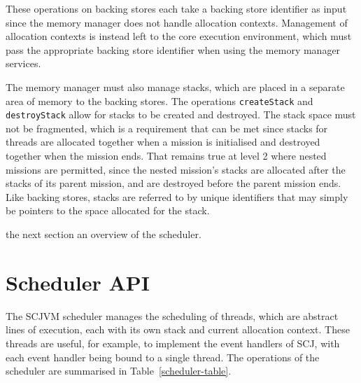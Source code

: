 These operations on backing stores each take a backing store
identifier as input since the memory manager does not handle
allocation contexts.
Management of allocation contexts is instead left to the core
execution environment, which must pass the appropriate backing store
identifier when using the memory manager services.

The memory manager must also manage stacks, which are placed in a
separate area of memory to the backing stores.
The operations \texttt{create\-Stack} and \texttt{destroy\-Stack}
allow for stacks to be created and destroyed.
The stack space must not be fragmented, which is a requirement that
can be met since stacks for threads are allocated together when a
mission is initialised and destroyed together when the mission ends.
That remains true at level 2 where nested missions are permitted,
since the nested mission's stacks are allocated after the stacks of
its parent mission, and are destroyed before the parent mission ends.
Like backing stores, stacks are referred to by unique identifiers that
may simply be pointers to the space allocated for the stack.

the next section an
overview of the scheduler.

\section{Scheduler API}
\label{scheduler-section}

The SCJVM scheduler manages the scheduling of threads, which are
abstract lines of execution, each with its own stack and current
allocation context.
These threads are useful, for example, to implement the event handlers
of SCJ, with each event handler being bound to a single thread.
The operations of the scheduler are summarised in
Table~\ref{scheduler-table}.

